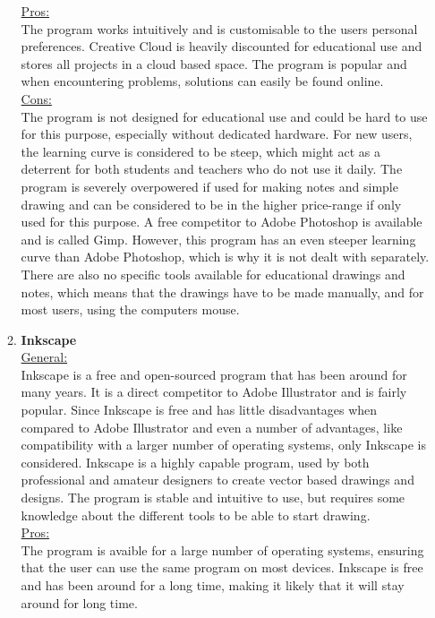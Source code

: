 \documentclass[a4paper,12pt]{article}
\begin{document}
\begin{enumerate}
\begin{enumerate}
    \underline{Pros:}\\
    The program works intuitively and is customisable to the users personal preferences. Creative Cloud is heavily discounted for educational use and stores all projects in a cloud based space. The program is popular and when encountering problems, solutions can easily be found online.\\
    
    \underline{Cons:}\\
    The program is not designed for educational use and could be hard to use for this purpose, especially without dedicated hardware. For new users, the learning curve is considered to be steep, which might act as a deterrent for both students and teachers who do not use it daily. The program is severely overpowered if used for making notes and simple drawing and can be considered to be in the higher price-range if only used for this purpose. A free competitor to Adobe Photoshop is available and is called Gimp. However, this program has an even steeper learning curve than Adobe Photoshop, which is why it is not dealt with separately. There are also no specific tools available for educational drawings and notes, which means that the drawings have to be made manually, and for most users, using the computers mouse.\\

  \item \textbf{Inkscape}\\
    \underline{General:}\\
    Inkscape is a free and open-sourced program that has been around for many years. It is a direct competitor to Adobe Illustrator and is fairly popular. Since Inkscape is free and has little disadvantages when compared to Adobe Illustrator and even a number of advantages, like compatibility with a larger number of operating systems, only Inkscape is considered. Inkscape is a highly capable program, used by both professional and amateur designers to create vector based drawings and designs. The program is stable and intuitive to use, but requires some knowledge about the different tools to be able to start drawing.\\
    
    \underline{Pros:}\\
    The program is avaible for a large number of operating systems, ensuring that the user can use the same program on most devices. Inkscape is free and has been around for a long time, making it likely that it will stay around for long time.
    

\end{enumerate}
\end{enumerate}
\end{document}

